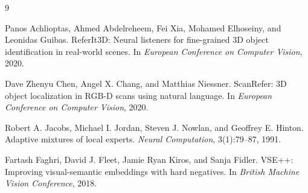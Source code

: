 \documentclass[11pt]{article}
\begin{document}
\begin{thebibliography}{9}

Panos Achlioptas, Ahmed Abdelreheem, Fei Xia, Mohamed Elhoseiny, and Leonidas Guibas.
\newblock ReferIt3D: Neural listeners for fine-grained 3D object identification in real-world scenes.
\newblock In \emph{European Conference on Computer Vision}, 2020.

Dave Zhenyu Chen, Angel X. Chang, and Matthias Niessner.
\newblock ScanRefer: 3D object localization in RGB-D scans using natural language.
\newblock In \emph{European Conference on Computer Vision}, 2020.

Robert A. Jacobs, Michael I. Jordan, Steven J. Nowlan, and Geoffrey E. Hinton.
\newblock Adaptive mixtures of local experts.
\newblock \emph{Neural Computation}, 3(1):79--87, 1991.

Fartash Faghri, David J. Fleet, Jamie Ryan Kiros, and Sanja Fidler.
\newblock VSE++: Improving visual-semantic embeddings with hard negatives.
\newblock In \emph{British Machine Vision Conference}, 2018.

\end{thebibliography}
\end{document}
